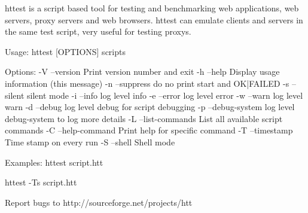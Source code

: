 \begin{usplisting}

    httest is a script based tool for testing and benchmarking web 
    applications, web servers, proxy servers and web browsers. httest 
    can emulate clients and servers in the same test script, very 
    useful for testing proxys.

    Usage: httest [OPTIONS] scripts

    Options:
      -V --version         Print version number and exit
      -h --help            Display usage information (this message)
      -n --suppress        do no print start and OK|FAILED
      -s --silent          silent mode
      -i --info            log level info
      -e --error           log level error
      -w --warn            log level warn
      -d --debug           log level debug for script debugging
      -p --debug-system    log level debug-system to log more details
      -L --list-commands   List all available script commands
      -C --help-command    Print help for specific command
      -T --timestamp       Time stamp on every run
      -S --shell           Shell mode
   
    Examples:
    httest script.htt
   
    httest -Ts script.htt
   
    Report bugs to http://sourceforge.net/projects/htt   
\end{usplisting}


